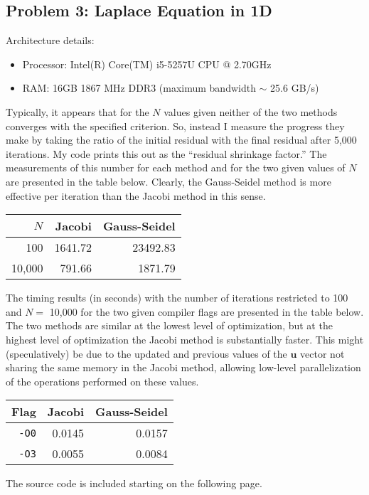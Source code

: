 \documentclass[11pt]{article}
\theoremstyle{plain} %
\begin{document}
\vspace{1em}

\subsection*{Problem 3: Laplace Equation in 1D}

\noindent
Architecture details:
\begin{itemize}
\item Processor: Intel(R) Core(TM) i5-5257U CPU @ 2.70GHz
\item RAM: 16GB 1867 MHz DDR3 (maximum bandwidth $\sim$ 25.6 GB/s)
\end{itemize}

\noindent
Typically, it appears that for the $N$ values given neither of the two methods converges with the specified criterion.
So, instead I measure the progress they make by taking the ratio of the initial residual with the final residual after 5,000 iterations.
My code prints this out as the ``residual shrinkage factor.''
The measurements of this number for each method and for the two given values of $N$ are presented in the table below.
Clearly, the Gauss-Seidel method is more effective per iteration than the Jacobi method in this sense.
\begin{center}
    \begin{tabular}{rrr}
      $N$ & Jacobi & Gauss-Seidel \\
      \hline
      100 & 1641.72 & 23492.83 \\
      10,000 & 791.66 & 1871.79
    \end{tabular}
\end{center}
\noindent
The timing results  (in seconds) with the number of iterations restricted to 100 and $N = $ 10,000 for the two given compiler flags are presented in the table below.
The two methods are similar at the lowest level of optimization, but at the highest level of optimization the Jacobi method is substantially faster.
This might (speculatively) be due to the updated and previous values of the $\bm u$ vector not sharing the same memory in the Jacobi method, allowing low-level parallelization of the operations performed on these values.
\begin{center}
    \begin{tabular}{rrr}
      Flag & Jacobi & Gauss-Seidel \\
      \hline
      \texttt{-O0} & 0.0145 & 0.0157 \\
      \texttt{-O3} & 0.0055 & 0.0084
    \end{tabular}
\end{center}
\noindent
The source code is included starting on the following page.

\newpage


\end{document}
